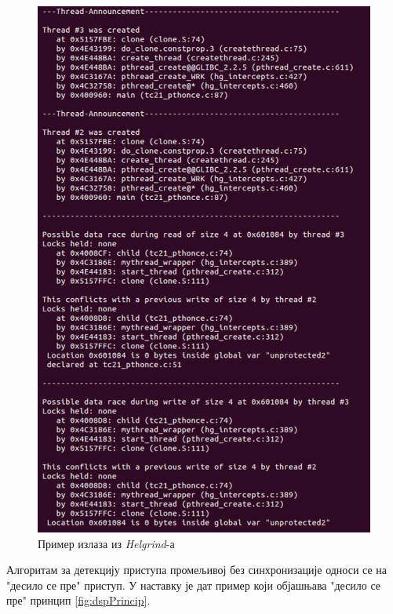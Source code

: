 \documentclass[12pt,oneside]{memoir}
\begin{document}
\begin{figure}[h!]
\begin{center}
\includegraphics[scale=0.75]{slika17.png}
\end{center}
\caption{Пример излаза из \textit{Helgrind}-а}
\label{fig:helgrind}
\end{figure}


\indent Алгоритам за детекцију приступа промељивој без синхронизације односи се на "десило се пре" приступ. У наставку је дат пример који објашњава "десило се пре" принцип \ref{fig:dspPrincip}.
\end{document}
